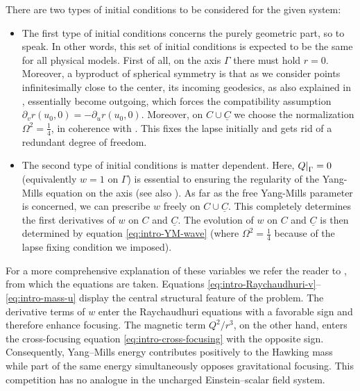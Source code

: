 \documentclass{article}[11pt]
\newcommand{\Cbar}{\underline{C}}
\newcommand\restri[2]{{%
		\left.\kern-\nulldelimiterspace %
		#1 %
		\right|_{#2} %
}}
\numberwithin{equation}{section}
\begin{document}
There are two types of initial conditions to be considered for the given system:


\vspace{3mm}

\begin{itemize}
\item The first type of initial conditions concerns the purely geometric part, so to speak. In other words, this set of initial conditions is expected to be the same for all physical models. First of all, on the axis $\Gamma$ there must hold $r=0$. Moreover, a byproduct of spherical symmetry is that as we consider points infinitesimally close to the center, its incoming geodesics, as also explained in \cite{AnLim}, essentially become outgoing, which forces the compatibility assumption $\partial_v r(u_0,0)= -\partial_u r(u_0,0)$. Moreover, on $C\cup \Cbar$ we choose the normalization $\Omega^2 = \frac{1}{4}$, in coherence with \cite{Li_Wang}. This fixes the lapse initially and gets rid of a redundant degree of freedom.

\item The second type of initial conditions is matter dependent. Here, $\restri{Q}{\Gamma}=0$ (equivalently $w=1$ on $\Gamma$) is essential to ensuring the regularity of the Yang-Mills equation on the axis (see also \cite{Li_Wang}). As far as the free Yang-Mills parameter is concerned, we can prescribe $w$ freely on $C \cup \Cbar$. This completely determines the first derivatives of $w$ on $C$ and $\Cbar$. The evolution of $w$ on $C$ and $\Cbar$ is then determined by equation \eqref{eq:intro-YM-wave} (where $\Omega^2=\frac{1}{4}$ because of the lapse fixing condition we imposed).
\end{itemize}



\noindent For a more comprehensive explanation of these variables we refer the reader to \cite{Li_Wang}, from which the equations are taken. 
\noindent Equations \eqref{eq:intro-Raychaudhuri-v}--\eqref{eq:intro-mass-u}
display the central structural feature of the problem. The derivative
terms of \(w\) enter the Raychaudhuri equations with a favorable sign and
therefore enhance focusing. The magnetic term \(Q^2/r^3\), on the
other hand, enters the cross-focusing equation
\eqref{eq:intro-cross-focusing} with the opposite sign. Consequently,
Yang--Mills energy contributes positively to the Hawking mass while part
of the same energy simultaneously opposes gravitational focusing. This
competition has no analogue in the uncharged Einstein--scalar field
system.
\end{document}
